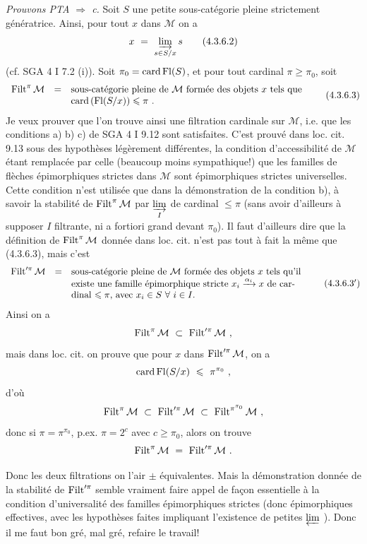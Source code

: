 \noindent\textit{Prouvons PTA $\Longrightarrow$ c.} Soit $S$ une petite sous-catégorie pleine strictement génératrice. Ainsi, pour tout $x$ dans $\mathcal M$ on a
\[
x\ =\ \varinjlim_{s\in S/x}s
\tag*{(4.3.6.2)}
\]
(cf. SGA 4 I 7.2 (i)). Soit $\pi_0=\operatorname{card}\operatorname{Fl}(S)$, et pour tout cardinal $\pi\geqslant\pi_0$, soit
\[
\begin{array}{lcl}
\Filt^\pi\mathcal M & = & \text{sous-catégorie pleine de $\mathcal M$ formée des objets $x$ tels que}\\
 & & \card\,(\Fl(S/x))\leqslant\pi\ .
\end{array}
\tag*{(4.3.6.3)}
\]
Je veux prouver que l'on trouve ainsi une filtration cardinale sur $\mathcal M$, i.e. que les conditions a) b) c) de SGA 4 I 9.12 sont satisfaites. C'est prouvé dans loc. cit. 9.13 sous des hypothèses légèrement différentes, la condition d'accessibilité de $\mathcal M$ étant remplacée par celle (beaucoup moins sympathique!) que les familles de flèches épimorphiques strictes dans $\mathcal M$ sont épimorphiques strictes universelles. Cette condition n'est utilisée que dans la démonstration de la condition b), à savoir la stabilité de $\operatorname{Filt}^\pi\mathcal M$ par $\varinjlim\limits_I$ de cardinal $\leqslant\pi$ (sans avoir d'ailleurs à supposer $I$ filtrante, ni a fortiori grand devant $\pi_0$). Il faut d'ailleurs dire que la définition de $\operatorname{Filt}^\pi\mathcal M$ donnée dans loc. cit. n'est pas tout à fait la même que (4.3.6.3), mais c'est
\[
\begin{array}{lcl}
\Filt'^{\pi}\mathcal M & = & \text{sous-catégorie pleine de $\mathcal M$ formée des objets $x$ tels qu'il}\\
 & & \text{existe une famille épimorphique stricte $x_i\xrightarrow{\alpha_i}x$ de car-}\\
 & & \text{dinal $\leqslant\pi$, avec $x_i\in S\ \forall\ i\in I$.}
\end{array}
\tag*{(4.3.6.3$'$)}
\]
Ainsi on a
\[
\Filt^\pi\mathcal M\ \subset\ \Filt'^{\pi}\mathcal M\ ,
\]
mais dans loc. cit. on prouve que pour $x$ dans $\operatorname{Filt}'^{\pi}\mathcal M$, on a
\[
\card\Fl(S/x)\ \leqslant\ \pi^{\pi_0}\ ,
\]
d'où
\[
\Filt^\pi\mathcal M\ \subset\ \Filt'^{\pi}\mathcal M\ \subset\ \Filt^{\pi^{\pi_0}}\mathcal M\ ,
\]
donc si $\pi=\pi^{\pi_0}$, p.ex. $\pi=2^c$ avec $c\geqslant\pi_0$, alors on trouve
\[
\Filt^\pi\mathcal M\ =\ \Filt'^{\pi}\mathcal M\ .
\]

\noindent Donc les deux filtrations on l'air $\pm$ équivalentes. Mais la démonstration donnée de la stabilité de $\operatorname{Filt}'^{\pi}$ semble vraiment faire appel de façon essentielle à la condition d'universalité des familles épimorphiques strictes (donc épimorphiques effectives, avec les hypothèses faites impliquant l'existence de petites $\varprojlim$ ). Donc il me faut bon gré, mal gré, refaire le travail! %

